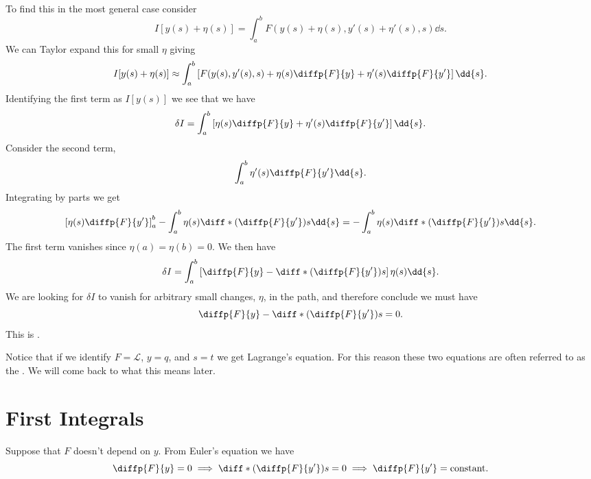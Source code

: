 \documentclass[fleqn]{NotesClass}
\newcommand*{\lagrangian}{\mathcal{L}}
\begin{document}
    To find this in the most general case consider
    \begin{equation}
        I[y(s) + \eta(s)] = \int_a^b F(y(s) + \eta(s), y'(s) + \eta'(s), s) \dd{s}.
    \end{equation}
    We can Taylor expand this for small \(\eta\) giving
    \begin{equation}
        I[y(s) + \eta(s)] \approx \int_a^b \left[ F(y(s), y'(s), s) + \eta(s)\diffp{F}{y} + \eta'(s)\diffp{F}{y'} \right] \dd{s}.
    \end{equation}
    Identifying the first term as \(I[y(s)]\) we see that we have
    \begin{equation}
        \delta I = \int_a^b \left[ \eta(s)\diffp{F}{y} + \eta'(s)\diffp{F}{y'} \right]\dd{s}.
    \end{equation}
    Consider the second term,
    \begin{equation}
        \int_a^b \eta'(s) \diffp{F}{y'} \dd{s}.
    \end{equation}
    Integrating by parts we get
    \begin{equation}
        \left[ \eta(s) \diffp{F}{y'} \right]_a^b - \int_a^b \eta(s)\diff*{\left( \diffp{F}{y'} \right)}{s} \dd{s} = - \int_a^b \eta(s)\diff*{\left( \diffp{F}{y'} \right)}{s} \dd{s}.
    \end{equation}
    The first term vanishes since \(\eta(a) = \eta(b) = 0\).
    We then have
    \begin{equation}
        \delta I = \int_a^b \left[ \diffp{F}{y} - \diff*{\left( \diffp{F}{y'} \right)}{s} \right] \eta(s) \dd{s}.
    \end{equation}
    We are looking for \(\delta I\) to vanish for arbitrary small changes, \(\eta\), in the path, and therefore conclude we must have
    \begin{equation}
        \diffp{F}{y} - \diff*{\left( \diffp{F}{y'} \right)}{s} = 0.
    \end{equation}
    This is .
    
    Notice that if we identify \(F = \lagrangian\), \(y = q\), and \(s = t\) we get Lagrange's equation.
    For this reason these two equations are often referred to as the .
    We will come back to what this means later.
    
    \section{First Integrals}
    Suppose that \(F\) doesn't depend on \(y\).
    From Euler's equation we have
    \begin{equation}
        \diffp{F}{y} = 0 \implies \diff*{\left( \diffp{F}{y'} \right)}{s} = 0 \implies \diffp{F}{y'} = \text{constant.}
    \end{equation}
    
\end{document}
